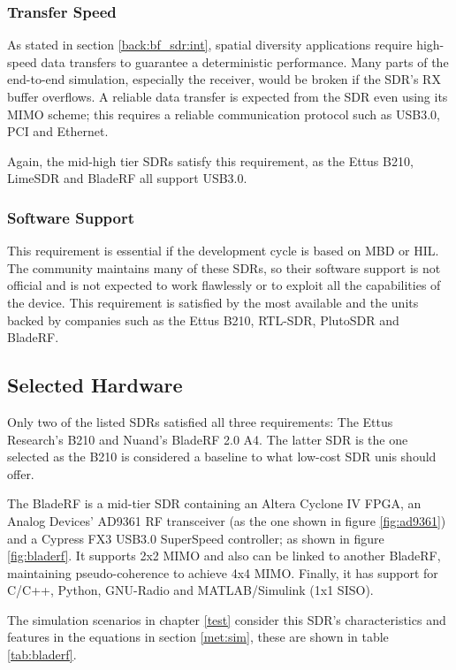 \documentclass[12pt,a4paper]{report}
\begin{document}
\subsubsection{Transfer Speed} \label{met:sdr:req:ts}
As stated in section \ref{back:bf_sdr:int}, spatial diversity applications require high-speed data transfers to guarantee a deterministic performance. Many parts of the end-to-end simulation, especially the receiver, would be broken if the SDR's RX buffer overflows. A reliable data transfer is expected from the SDR even using its MIMO scheme; this requires a reliable communication protocol such as USB3.0, PCI and Ethernet.

Again, the mid-high tier SDRs satisfy this requirement, as the Ettus B210, LimeSDR and BladeRF all support USB3.0.

\subsubsection{Software Support} \label{met:sdr:req:soft}
This requirement is essential if the development cycle is based on MBD or HIL. The community maintains many of these SDRs, so their software support is not official and is not expected to work flawlessly or to exploit all the capabilities of the device. This requirement is satisfied by the most available and the units backed by companies such as the Ettus B210, RTL-SDR, PlutoSDR and BladeRF.

\subsection{Selected Hardware} \label{met:sdr:sel}
Only two of the listed SDRs satisfied all three requirements: The Ettus Research's B210 and Nuand's BladeRF 2.0 A4. The latter SDR is the one selected as the B210 is considered a baseline to what low-cost SDR unis should offer.

The BladeRF is a mid-tier SDR containing an Altera Cyclone IV FPGA, an Analog Devices' AD9361 RF transceiver (as the one shown in figure \ref{fig:ad9361}) and a Cypress FX3 USB3.0 SuperSpeed controller; as shown in figure \ref{fig:bladerf}. It supports 2x2 MIMO and also can be linked to another BladeRF, maintaining pseudo-coherence to achieve 4x4 MIMO. Finally, it has support for C/C++, Python, GNU-Radio and MATLAB/Simulink (1x1 SISO). 

The simulation scenarios in chapter \ref{test} consider this SDR's characteristics and features in the equations in section \ref{met:sim}, these are shown in table \ref{tab:bladerf}.
\end{document}
